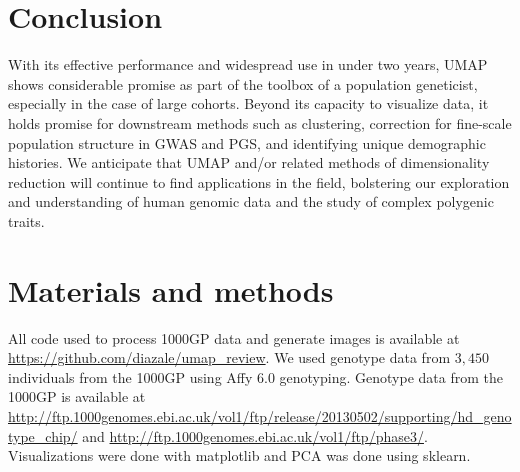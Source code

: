 \documentclass[12pt]{article}
\begin{document}
\section*{Conclusion}
With its effective performance and widespread use in under two years, UMAP shows considerable promise as part of the toolbox of a population geneticist, especially in the case of large cohorts. Beyond its capacity to visualize data, it holds promise for downstream methods such as clustering, correction for fine-scale population structure in GWAS and PGS, and identifying unique demographic histories. We anticipate that UMAP and/or related methods of dimensionality reduction will continue to find applications in the field, bolstering our exploration and understanding of human genomic data and the study of complex polygenic traits.

\section*{Materials and methods}
All code used to process 1000GP data and generate images is available at \url{https://github.com/diazale/umap_review}. We used genotype data from $3,450$ individuals from the 1000GP using Affy 6.0 genotyping\cite{10002015global}. Genotype data from the 1000GP is available at \url{http://ftp.1000genomes.ebi.ac.uk/vol1/ftp/release/20130502/supporting/hd_genotype_chip/} and \url{http://ftp.1000genomes.ebi.ac.uk/vol1/ftp/phase3/}. Visualizations were done with matplotlib\cite{Hunter2007} and PCA was done using sklearn\cite{scikit-learn}.


\clearpage
\end{document}

